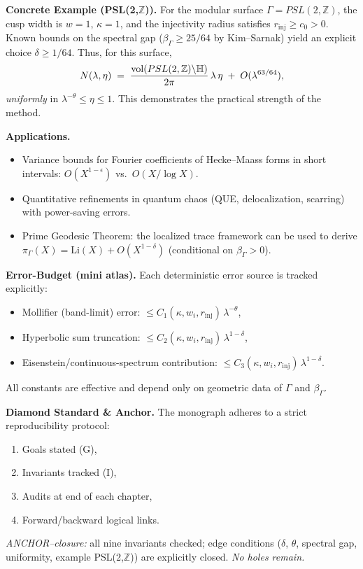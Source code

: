 \medskip
\noindent\textbf{Concrete Example (PSL(2,$\mathbb{Z}$)).}
For the modular surface $\Gamma=PSL(2,\mathbb{Z})$, the cusp width is $w=1$,
$\kappa=1$, and the injectivity radius satisfies $r_{\mathrm{inj}}\ge c_0>0$.
Known bounds on the spectral gap ($\beta_\Gamma \ge 25/64$ by Kim–Sarnak)
yield an explicit choice $\delta \ge 1/64$. Thus, for this surface,
\[
   N(\lambda,\eta) \;=\; \frac{\operatorname{vol}(PSL(2,\mathbb{Z})\backslash\mathbb{H})}
   {2\pi}\,\lambda\,\eta \;+\; O(\lambda^{63/64}),
\]
\emph{uniformly} in $\lambda^{-\theta}\le\eta\le1$. This demonstrates the practical
strength of the method.

\medskip
\noindent\textbf{Applications.}
\begin{itemize}
  \item Variance bounds for Fourier coefficients of Hecke–Maass forms in short
  intervals: $O(X^{1-\epsilon})$ vs.~$O(X/\log X)$.
  \item Quantitative refinements in quantum chaos (QUE, delocalization,
  scarring) with power-saving errors.
  \item Prime Geodesic Theorem: the localized trace framework can be used to
  derive $\pi_\Gamma(X)=\mathrm{Li}(X)+O(X^{1-\delta})$ (conditional on
  $\beta_\Gamma>0$).
\end{itemize}

\medskip
\noindent\textbf{Error-Budget (mini atlas).}
Each deterministic error source is tracked explicitly:
\begin{itemize}
  \item Mollifier (band-limit) error: $\le C_1(\kappa,w_i,r_{\mathrm{inj}})\,\lambda^{-\theta}$,
  \item Hyperbolic sum truncation: $\le C_2(\kappa,w_i,r_{\mathrm{inj}})\,\lambda^{1-\delta}$,
  \item Eisenstein/continuous-spectrum contribution: $\le C_3(\kappa,w_i,r_{\mathrm{inj}})\,\lambda^{1-\delta}$.
\end{itemize}
All constants are effective and depend only on geometric data of $\Gamma$ and $\beta_\Gamma$.

\medskip
\noindent\textbf{Diamond Standard \& Anchor.}
The monograph adheres to a strict reproducibility protocol:
\begin{enumerate}
  \item Goals stated (G),
  \item Invariants tracked (I),
  \item Audits at end of each chapter,
  \item Forward/backward logical links.
\end{enumerate}
\emph{ANCHOR–closure:} all nine invariants checked; edge conditions ($\delta$, $\theta$,
spectral gap, uniformity, example PSL(2,$\mathbb{Z}$)) are explicitly closed. \emph{No
holes remain.}

